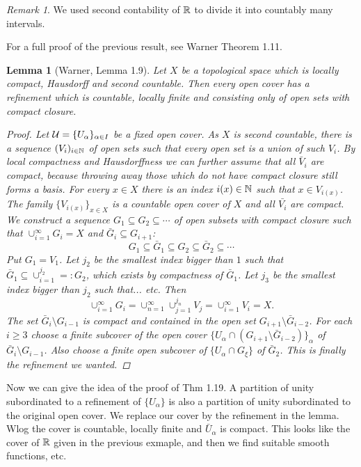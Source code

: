 \documentclass[A4paper, british, reqno]{amsart}
\theoremstyle{darkgreentheorem}
\newtheorem{lm}[thm]{Lemma}
\theoremstyle{darkbluedefinition}
\theoremstyle{darkredexample}
\theoremstyle{remark}
\newtheorem{rem}[thm]{Remark}
\newcommand{\1}{\mathbbm{1}}
\newcommand{\sub}{\subseteq}
\begin{document}
\begin{rem}
    We used second contability of $\mathbb{R}$ to divide it into countably many intervals.
\end{rem}

For a full proof of the previous result, see Warner Theorem 1.11.

\begin{lm}[Warner, Lemma 1.9]
    Let $X$ be a topological space which is locally compact, Hausdorff and second countable.
    Then every open cover has a refinement which is countable, locally finite and consisting only of open sets with compact closure.
    \begin{proof}
	Let $\mathcal{U}=\{U_{\alpha}\}_{\alpha\in I}$ be a fixed open cover.
	As $X$ is second countable, there is a sequence $(V_{i})_{i\in \mathbb{N}}$ of open sets such that every open set is a union of such $V_{i}$.
	By local compactness and Hausdorffness we can further assume that all $\bar{V}_{i}$ are compact, because throwing away those which do not have compact closure still forms a basis.
	For every $x\in X$ there is an index $i(x)\in \mathbb{N}$ such that $x\in V_{i(x)}$.
	The family $\{V_{i(x)}\}_{x\in X}$ is a countable open cover of $X$ and all $\bar{V_{i}}$ are compact.
	We construct a sequence $G_{1}\sub G_{2}\sub \cdots $ of open subsets with compact closure such that $\cup_{i=1}^{\infty}G_{i}=X$ and $\bar{G}_{i}\sub G_{i+1}$:
	\[ G_{1}\sub \bar{G}_{1}\sub G_{2}\sub \bar{G}_{2}\sub \cdots \]
	Put $G_{1}=V_{1}$.
	Let $j_{2}$ be the smallest index bigger than $1$ such that $\bar{G}_{1}\sub \cup_{i=1}^{j_{2}}=:G_{2}$, which exists by compactness of $\bar{G}_{1}$.
	Let $j_{3}$ be the smallest index bigger than $j_{2}$ such that... etc.
	Then
	\[ \cup_{i=1}^{\infty}G_{i}=\cup_{n=1}^{\infty}\cup_{j=1}^{j_{n}}V_{j}=\cup_{i=1}^{\infty}V_{i}=X.\]
	The set $\bar{G}_{i}\setminus G_{i-1}$ is compact and contained in the open set $G_{i+1}\setminus \bar{G}_{i-2}$.
	For each $i\geqslant 3$ choose a finite subcover of the open cover $\{U_{\alpha}\cap (G_{i+1}\setminus \bar{G}_{i-2})\}_{\alpha}$ of $\bar{G}_{i}\setminus G_{i-1}$.
	Also choose a finite open subcover of $\{U_{\alpha} \cap G_{\xi}\}$ of $\bar{G}_{2}$.
	This is finally the refinement we wanted.
    \end{proof}
\end{lm}

Now we can give the idea of the proof of Thm 1.19.
A partition of unity subordinated to a refinement of $\{U_{\alpha}\}$ is also a partition of unity subordinated to the original open cover.
We replace our cover by the refinement in the lemma.
Wlog the cover is countable, locally finite and $\bar{U}_{\alpha}$ is compact.
This looks like the cover of $\mathbb{R}$ given in the previous exmaple, and then we find suitable smooth functions, etc.
\end{document}
